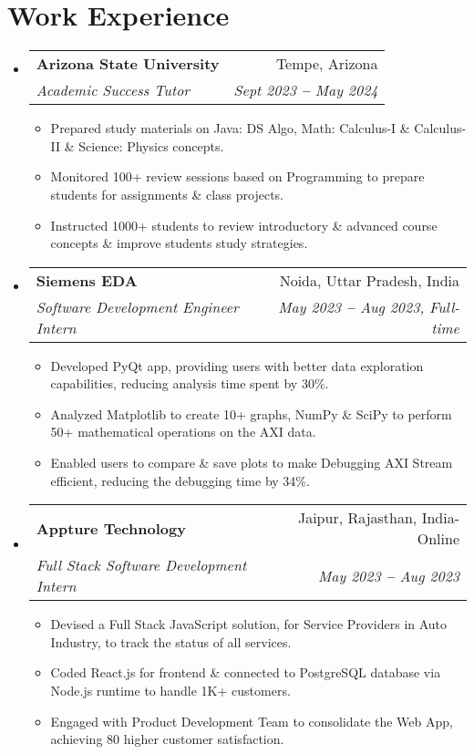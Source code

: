\documentclass[letterpaper,11pt]{article}
\makeatletter
\newcommand{\resumeItem}[1]{
  \item\small{
    {#1 \vspace{-2pt}}
  }
}
\newcommand{\resumeSubheading}[4]{
  \vspace{-2pt}\item
    \begin{tabular*}{0.97\textwidth}[t]{l@{\extracolsep{\fill}}r}
      \textbf{#1} & #2 \\
      \textit{\small#3} & \textit{\small #4} \\
    \end{tabular*}\vspace{-7pt}
}
\newcommand{\resumeSubHeadingListStart}{\begin{itemize}[leftmargin=0.15in, label={}]}
\newcommand{\resumeSubHeadingListEnd}{\end{itemize}}
\newcommand{\resumeItemListStart}{\begin{itemize}[leftmargin=0.2in]}
\newcommand{\resumeItemListEnd}{\end{itemize}\vspace{-5pt}}
\makeatother
\begin{document}

\section{Work Experience}
  \resumeSubHeadingListStart

    \resumeSubheading
      {Arizona State University}{Tempe, Arizona}
      {Academic Success Tutor}{Sept 2023 \textbf{--} May 2024}
        \resumeItemListStart
          \resumeItem{Prepared study materials on Java: DS Algo, Math: Calculus-I \& Calculus-II \& Science: Physics concepts.}
          \resumeItem{Monitored 100+ review sessions based on Programming to prepare students for assignments \& class projects.}
          \resumeItem{Instructed 1000+ students to review introductory \& advanced course concepts \& improve students study strategies.}
        \resumeItemListEnd

    \resumeSubheading
      {Siemens EDA}{Noida, Uttar Pradesh, India}
      {Software Development Engineer Intern}{May 2023 \textbf{--} Aug 2023, Full-time}
        \resumeItemListStart
          \resumeItem{Developed PyQt app, providing users with better data exploration capabilities, reducing analysis time spent by 30\%.}
          \resumeItem{Analyzed Matplotlib to create 10+ graphs, NumPy \& SciPy to perform 50+ mathematical operations on the AXI data.}
          \resumeItem{Enabled users to compare \& save plots to make Debugging AXI Stream efficient, reducing the debugging time by 34\%.}
        \resumeItemListEnd

    \resumeSubheading
      {Appture Technology}{Jaipur, Rajasthan, India- Online}
      {Full Stack Software Development Intern}{May 2023 \textbf{--} Aug 2023}
        \resumeItemListStart
            \resumeItem{Devised a Full Stack JavaScript solution, for Service Providers in Auto Industry, to track the status of all services.}
            \resumeItem{Coded React.js for frontend \& connected to PostgreSQL database via Node.js runtime to handle 1K+ customers.}
            \resumeItem{Engaged with Product Development Team to consolidate the Web App, achieving 80 higher customer satisfaction.}
        \resumeItemListEnd
  \resumeSubHeadingListEnd

\end{document}
